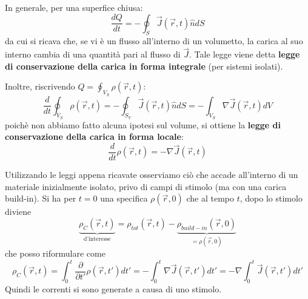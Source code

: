 \documentclass{book}
\begin{document}
\begin{center}
\end{center}
In generale, per una superfice chiusa:
\[
\frac{dQ}{dt}=-\oint_S \vec{J}(\vec{r}, t)\hat{n}dS
\]
da cui si ricava che, se vi è un flusso all'interno di un volumetto, la carica al suo interno cambia di una quantità pari al flusso di $\vec{J}$.
Tale legge viene detta \textbf{legge di conservazione della carica in forma integrale} (per sistemi isolati).

Inoltre, riscrivendo $Q=\oint_{V_S}\rho(\vec{r},t)$:
\[
\displaystyle \frac{d}{dt}\oint_{V_S}\rho(\vec{r},t)=-\oint_{S_V}\vec{J}(\vec{r},t)\hat{n}dS=-\int_{V_{S}} \nabla \vec{J}(\vec{r},t) dV
\]
poichè non abbiamo fatto alcuna ipotesi sul volume, si ottiene la \textbf{legge di conservazione della carica in forma locale}:
\[
\frac{d}{dt}\rho(\vec{r},t)=-\nabla\vec{J}(\vec{r},t)
\]

Utilizzando le leggi appena ricavate osserviamo ciò che accade all'interno di un materiale inizialmente isolato, privo di campi di stimolo
(ma con una carica build-in). Si ha per $t=0$ una specifica $\rho(\vec{r},0)$ che al tempo $t$, dopo lo stimolo diviene
\[
 \underbrace{\rho_{C}(\vec{r},t)}_{\text{d'interesse}}= \rho_{tot}(\vec{r},t)- \underbrace{\rho_{build-in}(\vec{r},0)}_{=\rho(\vec{r},0)}
\]
che posso riformulare come 
\[
\rho_{C}(\vec{r},t)=\int_{0}^{t}\frac{\partial}{\partial{t'}}\rho(\vec{r},t')dt'=-\int_{0}^{t}\nabla\vec{J}(\vec{r},t')dt'=-\nabla\int_{0}^{t}\vec{J}(\vec{r},t')dt'
\]
Quindi le correnti si sono generate a causa di uno stimolo.
\end{document}
